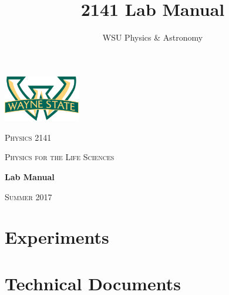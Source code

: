 \documentclass[hidelinks,12pt,letterpaper,twoside]{book}
\author{WSU Physics \& Astronomy}
\title{2141 Lab Manual}
\newcommand\blankpage{%
    \null
    \thispagestyle{empty}%
    \newpage}
\newcommand{\semester}{Summer 2017}
\begin{document}
\begin{titlepage}
	\centering
	\includegraphics[width=0.25\textwidth]{wsu_logo}\par\vspace{1cm}
	{\scshape\LARGE Physics 2141 \par}
	\vspace{0.5cm}
	{\scshape\large Physics for the Life Sciences\par}
	\vfill
	\textbf{\huge Lab Manual} \par
	\vfill
	{\scshape\large \semester{} \par}
\end{titlepage}

\newpage{\blankpage}




\renewcommand\contentsname{Physics for the Life Sciences}
\setcounter{tocdepth}{1}
\tableofcontents{\thispagestyle{fancy}}

\newpage{\blankpage}

\part{Experiments}
\renewcommand{\chaptername}{Experiment}
\setcounter{chapter}{5}







\part{Technical Documents}
\renewcommand{\chaptername}{Technical Document}
\renewcommand\thechapter{\Alph{chapter}}
\newpage{\blankpage}
\newpage{\blankpage}
\newpage{\blankpage}
\newpage{\blankpage}
\end{document}
